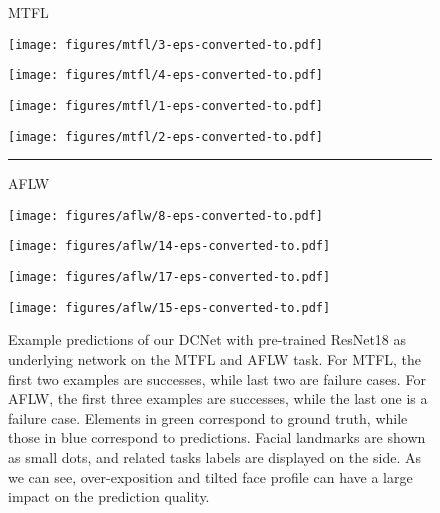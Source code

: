 \documentclass[runningheads]{llncs}
\begin{document}
\begin{figure}[t]
    \begin{minipage}{\linewidth}
        \begin{minipage}{\linewidth}
            \centering
            MTFL
        \end{minipage}
        \begin{minipage}{0.24\linewidth}
            \texttt{[image: figures/mtfl/3-eps-converted-to.pdf]}
        \end{minipage}
        \begin{minipage}{0.24\linewidth}
            \texttt{[image: figures/mtfl/4-eps-converted-to.pdf]}
        \end{minipage}
        \begin{minipage}{0.24\linewidth}
            \texttt{[image: figures/mtfl/1-eps-converted-to.pdf]}
        \end{minipage}
        \begin{minipage}{0.24\linewidth}
            \texttt{[image: figures/mtfl/2-eps-converted-to.pdf]}
        \end{minipage}
        \hrule
        \vspace{3pt}
        \begin{minipage}{\linewidth}
            \centering
            AFLW
        \end{minipage}        
        \begin{minipage}{0.24\linewidth}
            \texttt{[image: figures/aflw/8-eps-converted-to.pdf]}
        \end{minipage}
        \begin{minipage}{0.24\linewidth}
            \texttt{[image: figures/aflw/14-eps-converted-to.pdf]}
        \end{minipage}
        \begin{minipage}{0.24\linewidth}
            \texttt{[image: figures/aflw/17-eps-converted-to.pdf]}
        \end{minipage}
        \begin{minipage}{0.24\linewidth}
            \texttt{[image: figures/aflw/15-eps-converted-to.pdf]}
        \end{minipage}
    \end{minipage}
    \caption{Example predictions of our DCNet with pre-trained ResNet18 as underlying network on the MTFL and AFLW task. For MTFL, the first two examples are successes, while last two are failure cases. For AFLW, the first three examples are successes, while the last one is a failure case. Elements in green correspond to ground truth, while those in blue correspond to predictions. Facial landmarks are shown as small dots, and related tasks labels are displayed on the side. As we can see, over-exposition and tilted face profile can have a large impact on the prediction quality.}
    \label{fig:example-predictions}
\end{figure}
\end{document}
